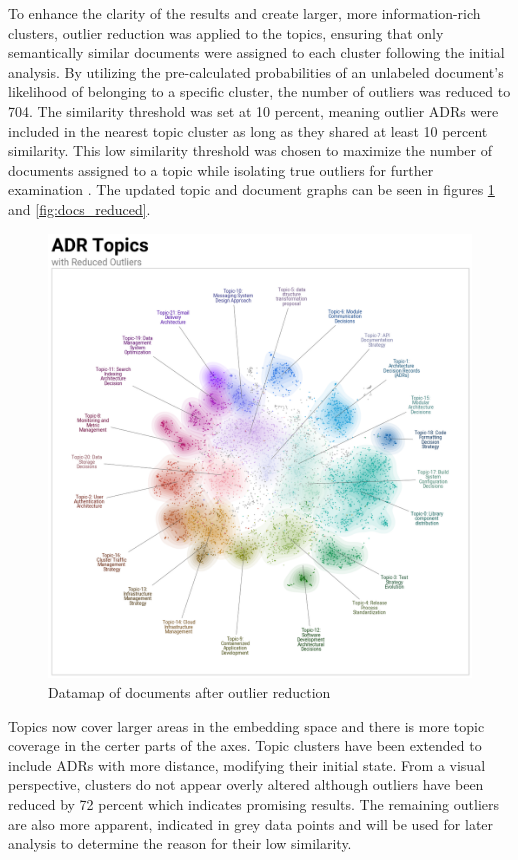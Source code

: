         To enhance the clarity of the results and create larger, more information-rich clusters, outlier reduction was applied to the topics, ensuring that only semantically similar documents were assigned to each cluster following the initial analysis. By utilizing the pre-calculated probabilities of an unlabeled document's likelihood of belonging to a specific cluster, the number of outliers was reduced to 704. The similarity threshold was set at 10 percent, meaning outlier ADRs were included in the nearest topic cluster as long as they shared at least 10 percent similarity. This low similarity threshold was chosen to maximize the number of documents assigned to a topic while isolating true outliers for further examination . The updated topic and document graphs can be seen in figures \ref{fig:similarity_matrix_reduced} and \ref{fig:docs_reduced}. 
        
        \begin{figure}[h]
            \centering
            \includegraphics[scale=0.4]{figures/BerTopic_Reduced/datamap_reduced_outliers.png}
            \caption{Datamap of documents after outlier reduction}
            \label{fig:similarity_matrix_reduced}
        \end{figure}
        
        Topics now cover larger areas in the embedding space and there is more topic coverage in the certer parts of the axes. Topic clusters have been extended to include ADRs with more distance, modifying their initial state. From a visual perspective, clusters do not appear overly altered although outliers have been reduced by 72 percent which indicates promising results. The remaining outliers are also more apparent, indicated in grey data points and will be used for later analysis to determine the reason for their low similarity.

